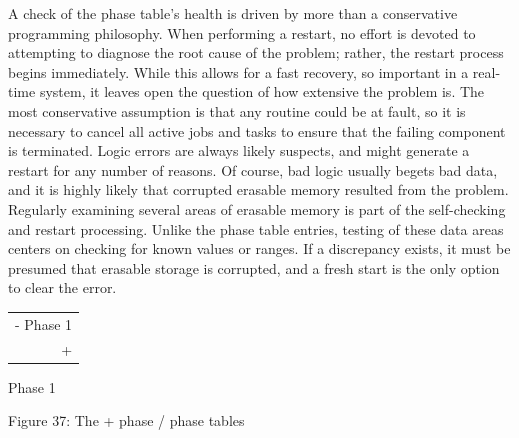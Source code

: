 \documentclass[refcap, oxford]{ahsan}
\begin{document}
A check of the phase table's health is driven by more than a conservative programming philosophy. When performing a restart, no effort is devoted to attempting to diagnose the root cause of the problem; rather, the restart process begins immediately. While this allows for a fast recovery, so important in a real-time system, it leaves open the question of how extensive the problem is. The most conservative assumption is that any routine could be at fault, so it is necessary to cancel all active jobs and tasks to ensure that the failing component is terminated. Logic errors are always likely suspects, and might generate a restart for any number of reasons. Of course, bad logic usually begets bad data, and it is highly likely that corrupted erasable memory resulted from the problem. Regularly examining several areas of erasable memory is part of the self-checking and restart processing. Unlike the phase table entries, testing of these data areas centers on checking for known values or ranges. If a discrepancy exists, it must be presumed that erasable storage is corrupted, and a fresh start is the only option to clear the error.

\ifextraC
\begin{center}
\begin{tabular}{|r|}
\hline
- Phase 1 \\
+ \\
\hline
\end{tabular}
\end{center} Phase 1

Figure 37: The + phase / phase tables
\fi     




\end{document}
